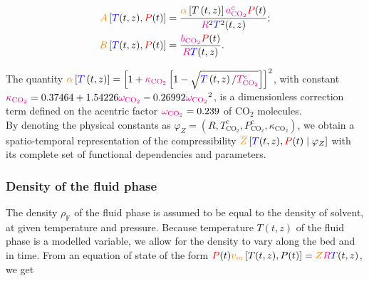 \documentclass[../Article_Model_Parameters.tex]{subfiles}
\begin{document}
	{\footnotesize
	\begin{subequations} \label{eq: PR_AB}
		\begin{align} 
			{\color{orange}A}\left[{\color{blue}T}(t,z), {\color{red}P}(t)\right]	& = \dfrac{{\color{orange}\alpha}\left[T\left(t,z\right)\right]{\color{magenta}a^c_{\text{CO}_2}}{\color{red}P}(t)}{{\color{magenta}R}^2{\color{blue}T}^2(t,z)};													\label{eq: PR_A}\\
			{\color{orange}B}\left[{\color{blue}T}(t,z), {\color{red}P}(t)\right]	& = \dfrac{{\color{magenta}b_{\text{CO}_2}}{\color{red}P}(t)}{{\color{magenta}R}{\color{blue}T}(t,z)}	\label{eq: PR_B}.
		\end{align}
	\end{subequations}}

	The quantity {\small${\color{orange}\alpha}\left[{\color{blue}T}\left(t,z\right)\right]= \left[1 + {\color{magenta}\kappa_{\text{CO}_2}} \left[1 - \sqrt{{\color{blue}T}\left(t,z\right) / {\color{magenta}T^c_{\text{CO}_2}}} \right] \right]^2$}, with constant ${\color{magenta}\kappa_{\text{CO}_2}} = 0.37464 + 1.54226 {\color{magenta}\omega_{\text{CO}_2}} - 0.26992 {\color{magenta}\omega_{\text{CO}_2}}^2$, is a dimensionless correction term defined on the acentric factor ${\color{magenta}\omega_{\text{CO}_2}} = 0.239$ of $\text{CO}_2$ molecules. \\
	
	By denoting the physical constants as {\small$\varphi_{Z} = \left(R,T^c_{\text{CO}_2},P^c_{\text{CO}_2},\kappa_{\text{CO}_2}\right)$}, we obtain a spatio-temporal representation of the compressibility ${\color{orange}\overline{Z}}\left[{\color{blue}T}(t,z), {\color{red}P}(t) \mid \varphi_{Z}\right]$ with its complete set of functional dependencies and parameters. \\
	
	\subsubsection{Density of the fluid phase} \label{subsubsec: Fluid density}
	
	The density $\rho_{\text{F}}$ of the fluid phase is assumed to be equal to the density of solvent, at given temperature and pressure. Because temperature $T(t,z)$ of the fluid phase is a modelled variable, we allow for the density to vary along the bed and in time. From an equation of state of the form ${\color{red}P}(t) {\color{orange}v_m}\left[T(t,z),P(t)\right] = {\color{orange}Z}{\color{magenta}R}{\color{blue}T}(t,z)$, we get
	
\end{document}
